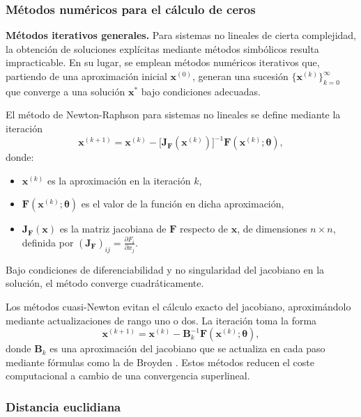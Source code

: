 \documentclass[12pt,a4paper]{article}
\newcommand{\xvec}{\mathbf{x}}
\newcommand{\thetavec}{\boldsymbol{\theta}}
\newcommand{\Fvec}{\mathbf{F}}
\newcommand{\jac}{\mathbf{J}}
\begin{document}
\subsubsection*{Métodos numéricos para el cálculo de ceros}

\textbf{Métodos iterativos generales.} Para sistemas no lineales de cierta complejidad, la obtención de soluciones explícitas mediante métodos simbólicos resulta impracticable. En su lugar, se emplean métodos numéricos iterativos que, partiendo de una aproximación inicial \(\xvec^{(0)}\), generan una sucesión \(\{\xvec^{(k)}\}_{k=0}^{\infty}\) que converge a una solución \(\xvec^*\) bajo condiciones adecuadas.

El método de Newton-Raphson para sistemas no lineales \cite{burden2010numerical} se define mediante la iteración
\begin{equation}
    \xvec^{(k+1)} = \xvec^{(k)} - \bigl[\jac_{\Fvec}(\xvec^{(k)})\bigr]^{-1} \Fvec(\xvec^{(k)}; \thetavec),
    \label{eq:newton}
\end{equation}
donde:
\begin{itemize}
    \item \(\xvec^{(k)}\) es la aproximación en la iteración \(k\),
    \item \(\Fvec(\xvec^{(k)}; \thetavec)\) es el valor de la función en dicha aproximación,
    \item \(\jac_{\Fvec}(\xvec)\) es la matriz jacobiana de \(\Fvec\) respecto de \(\xvec\), de dimensiones \(n \times n\), definida por \((\jac_{\Fvec})_{ij} = \frac{\partial F_i}{\partial x_j}\).
\end{itemize}
Bajo condiciones de diferenciabilidad y no singularidad del jacobiano en la solución, el método converge cuadráticamente.

Los métodos cuasi-Newton \cite{nocedal2006numerical} evitan el cálculo exacto del jacobiano, aproximándolo mediante actualizaciones de rango uno o dos. La iteración toma la forma
\[
\xvec^{(k+1)} = \xvec^{(k)} - \mathbf{B}_k^{-1} \Fvec(\xvec^{(k)}; \thetavec),
\]
donde \(\mathbf{B}_k\) es una aproximación del jacobiano que se actualiza en cada paso mediante fórmulas como la de Broyden \cite{broyden1965class}. Estos métodos reducen el coste computacional a cambio de una convergencia superlineal.

\subsubsection*{Distancia euclidiana}
\end{document}
